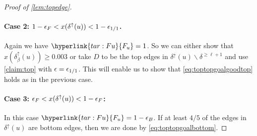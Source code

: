 \begin{proof}[Proof of \cref{lem:topedge}]
\paragraph{Case 2: $ 1-{\epsilon}_F < x(\delta^\uparrow (u)) < 1- {\epsilon}_{1/1}$. } Again we have $\hyperlink{tar:Fu}{F_u}=1$.
So we can either show that $x(\delta^\uparrow_\beta(u))\geq 0.003$ or take $D$ to be the top edges in  $\delta^\uparrow (u) \smallsetminus \delta^{\ge \ell+1} $ and use \cref{claim:top} with ${\epsilon} = {\epsilon}_{1/1}$. This will enable us  to show that \eqref{eq:toptopgoalgoodtop} holds as in 
 the previous case.


\paragraph{Case 3: $ {\epsilon}_F < x(\delta^\uparrow (u)) < 1- {\epsilon}_F$: }
In this case $\hyperlink{tar:Fu}{F_u}=1-\eps_B$.
If at least  $4/5$ of the edges in $ \delta^\uparrow(u)$ are bottom edges, then we are done by \eqref{eq:toptopgoalbottom}.


\end{proof}

